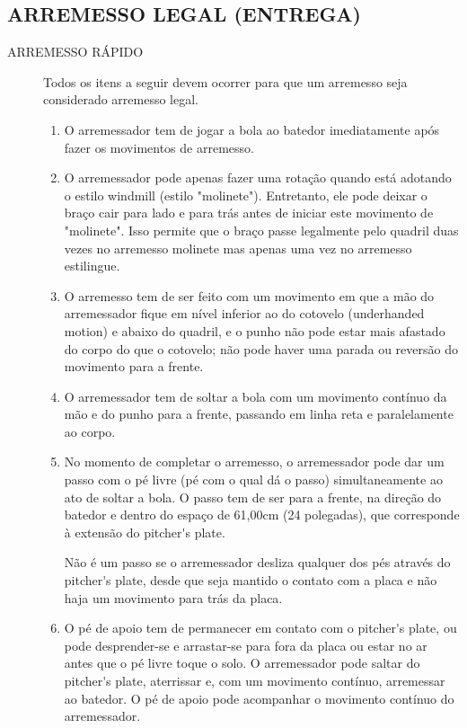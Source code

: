 \subsection{ARREMESSO LEGAL (ENTREGA)}
\begin{description}
	\item[ARREMESSO RÁPIDO] Todos os itens a seguir devem ocorrer para que um arremesso seja considerado arremesso legal.
	\begin{enumerate}[label=(\alph*)]
		\item O arremessador tem de jogar a bola ao batedor imediatamente após fazer os movimentos de arremesso.
		\item O arremessador pode apenas fazer uma rotação quando está adotando o estilo \gls{windmill} (estilo "molinete"). Entretanto, ele pode deixar o braço cair para  lado e para trás antes de iniciar este movimento de "molinete". Isso permite que o braço passe legalmente pelo quadril duas vezes no arremesso molinete mas apenas uma vez no arremesso estilingue.
		\item  O arremesso tem de ser feito com um movimento em que a mão do arremessador fique em nível inferior ao do cotovelo (\gls{underhanded motion}) e abaixo do quadril, e o punho não pode estar mais afastado do corpo do que o cotovelo; não pode haver uma parada ou reversão do movimento para a frente.
		\item  O arremessador tem de soltar a bola com um movimento contínuo da mão e do punho para a frente, passando em linha reta e paralelamente ao corpo.
		\item  No momento de completar o arremesso, o arremessador pode dar um passo com o pé livre (pé com o qual dá o passo) simultaneamente ao ato de soltar a  bola. O passo tem de ser para a frente, na direção do batedor e dentro do espaço de 61,00cm (24 polegadas), que corresponde à extensão do \gls{pitcher's plate}.

		Não é um passo se o arremessador desliza qualquer dos pés através do \gls{pitcher's plate}, desde que seja mantido o contato com a placa e não haja um movimento para trás da placa.

		\item  O pé de apoio tem de permanecer em contato com o \gls{pitcher's plate}, ou pode desprender-se e arrastar-se para fora da placa ou estar no ar antes que o pé livre toque o solo. O arremessador pode saltar do \gls{pitcher's plate}, aterrissar e, com um movimento contínuo, arremessar ao batedor. O pé de apoio pode acompanhar o movimento contínuo do arremessador.


\end{enumerate}
\end{description}
